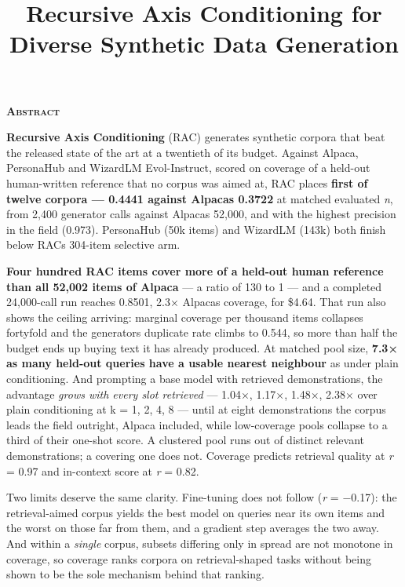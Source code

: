 \documentclass[
  10pt,
]{article}
\title{Recursive Axis Conditioning for Diverse Synthetic Data
Generation}
\author{}
\date{}
\theoremstyle{plain}
\theoremstyle{definition}
\newenvironment{iclrabstract}
  {\vspace{0.4em}\begin{center}{\bfseries\scshape Abstract}\end{center}
   \begin{list}{}{\setlength{\leftmargin}{0.45in}\setlength{\rightmargin}{0.45in}}\item[]\relax}
  {\end{list}\vspace{0.6em}}
\begin{document}
\maketitle

\begin{iclrabstract}

\textbf{Recursive Axis Conditioning} (RAC) generates synthetic corpora
that beat the released state of the art at a twentieth of its budget.
Against Alpaca, PersonaHub and WizardLM Evol-Instruct, scored on
coverage of a held-out human-written reference that no corpus was aimed
at, RAC places \textbf{first of twelve corpora --- 0.4441 against
Alpaca\textquotesingle s 0.3722} at matched evaluated \emph{n}, from
2,400 generator calls against Alpaca\textquotesingle s 52,000, and with
the highest precision in the field (0.973). PersonaHub (50k items) and
WizardLM (143k) both finish below RAC\textquotesingle s 304-item
selective arm.

\textbf{Four hundred RAC items cover more of a held-out human reference
than all 52,002 items of Alpaca} --- a ratio of 130 to 1 --- and a
completed 24,000-call run reaches 0.8501, 2.3× Alpaca\textquotesingle s
coverage, for \$4.64. That run also shows the ceiling arriving: marginal
coverage per thousand items collapses fortyfold and the
generator\textquotesingle s duplicate rate climbs to 0.544, so more than
half the budget ends up buying text it has already produced. At matched
pool size, \textbf{7.3× as many held-out queries have a usable nearest
neighbour} as under plain conditioning. And prompting a base model with
retrieved demonstrations, the advantage \emph{grows with every slot
retrieved} --- 1.04×, 1.17×, 1.48×, 2.38× over plain conditioning at k =
1, 2, 4, 8 --- until at eight demonstrations the corpus leads the field
outright, Alpaca included, while low-coverage pools collapse to a third
of their one-shot score. A clustered pool runs out of distinct relevant
demonstrations; a covering one does not. Coverage predicts retrieval
quality at \emph{r} = 0.97 and in-context score at \emph{r} = 0.82.

Two limits deserve the same clarity. Fine-tuning does not follow
(\emph{r} = −0.17): the retrieval-aimed corpus yields the best model on
queries near its own items and the worst on those far from them, and a
gradient step averages the two away. And within a \emph{single} corpus,
subsets differing only in spread are not monotone in coverage, so
coverage ranks corpora on retrieval-shaped tasks without being shown to
be the sole mechanism behind that ranking.


\end{iclrabstract}
\end{document}
